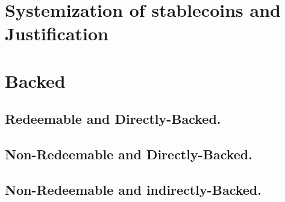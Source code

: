 
\section{Systemization of stablecoins and Justification}
 \par





\section{Backed}

\subsection{Redeemable and Directly-Backed.}


\subsection{Non-Redeemable and Directly-Backed.}
% 

\subsection{Non-Redeemable and indirectly-Backed.}


